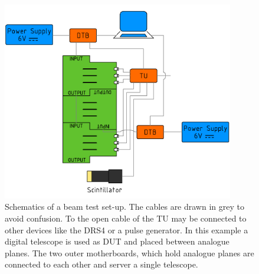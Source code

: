 \documentclass[british,11pt,a4paper]{memoir}
\begin{document}
\begin{figure}[ht]
	\centering
	\includegraphics[width=0.9\textwidth]{felltel1}
	\caption{Schematics of a beam test set-up. The cables are drawn in grey to avoid confusion. To the open cable of the \ac{TU} may be connected to other devices like the DRS4 or a pulse generator. In this example a digital telescope is used as \ac{DUT} and placed between analogue planes. The two outer motherboards, which hold analogue planes are connected to each other and server a single telescope.}
	\label{pfulldraw}
\end{figure}\no
\end{document}
